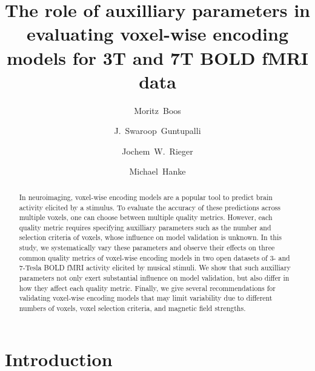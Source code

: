 
\newcommand{\beginsupplement}{%
        \setcounter{table}{0}
        \renewcommand{\thetable}{S\arabic{table}}%
        \setcounter{figure}{0}
        \renewcommand{\thefigure}{S\arabic{figure}}%
     }




\title{The role of auxilliary parameters in evaluating voxel-wise encoding models for 3T and 7T BOLD fMRI data}


\author[1]{Moritz~Boos}
\author[2]{J.~Swaroop~Guntupalli}
\author[1]{Jochem~W.~Rieger}
\author[3,4]{Michael~Hanke}

\maketitle

\begin{abstract}
In neuroimaging, voxel-wise encoding models are a popular tool to predict brain activity elicited by a stimulus.
To evaluate the accuracy of these predictions across multiple voxels, one can choose between multiple quality metrics.
However, each quality metric requires specifying auxilliary parameters such as the number and selection criteria of voxels, whose influence on model validation is unknown.
In this study, we systematically vary these parameters and observe their effects on three common quality metrics of voxel-wise encoding models in two open datasets of 3- and 7-Tesla BOLD fMRI activity elicited by musical stimuli.
We show that such auxilliary parameters not only exert substantial influence on model validation, but also differ in how they affect each quality metric.
Finally, we give several recommendations for validating voxel-wise encoding models that may limit variability due to different numbers of voxels, voxel selection criteria, and magnetic field strengths.
\end{abstract}

\clearpage


\section*{Introduction}

